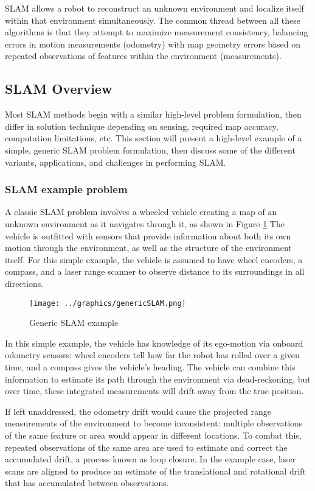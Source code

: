 SLAM allows a robot to reconstruct an unknown environment and localize itself within that environment simultaneously.  The common thread between all these algorithms is that they attempt to maximize measurement consistency, balancing errors in motion measurements (odometry) with map geometry errors based on repeated observations of features within the environment (measurements).

\subsection{SLAM Overview}

Most SLAM methods begin with a similar high-level problem formulation, then differ in solution technique depending on sensing, required map accuracy, computation limitations, etc. This section will present a high-level example of a simple, generic SLAM problem formulation, then discuss some of the different variants, applications, and challenges in performing SLAM. 

\subsubsection{SLAM example problem}
\label{sec:genericSLAM}
A classic SLAM problem involves a wheeled vehicle creating a map of an unknown environment as it navigates through it, as shown in Figure \ref{fig:GenericSLAM} The vehicle is outfitted with sensors that provide information about both its own motion through the environment, as well as the structure of the environment itself. For this simple example, the vehicle is assumed to have wheel encoders, a compass, and a laser range scanner to observe distance to its surroundings in all directions.

 \begin{figure}[!htb]
   \centering
   \texttt{[image: ../graphics/genericSLAM.png]} %
   \caption{ Generic SLAM example}
   \label{fig:GenericSLAM}
\end{figure}


In this simple example, the vehicle has knowledge of its ego-motion via onboard odometry sensors: wheel encoders tell how far the robot has rolled over a given time, and a compass gives the vehicle's heading. The vehicle can combine this information to estimate its path through the environment via dead-reckoning, but over time, these integrated measurements will drift away from the true position.

If left unaddressed, the odometry drift would cause the projected range measurements of the environment to become inconsistent: multiple observations of the same feature or area would appear in different locations. To combat this, repeated observations of the same area are used to estimate and correct the accumulated drift, a process known as loop closure. In the example case, laser scans are aligned to produce an estimate of the translational and rotational drift that has accumulated between observations. 


